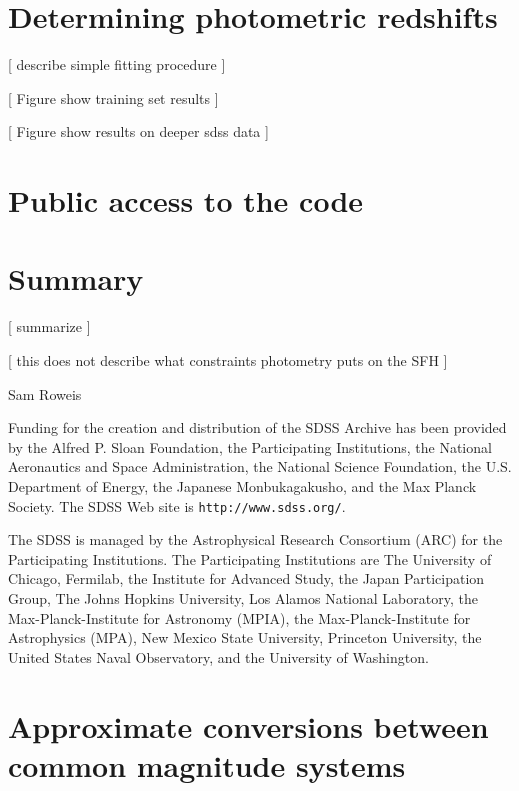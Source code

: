 \documentclass[10pt,preprint]{aastex}
\begin{document}
\section{Determining photometric redshifts}
\label{kphotoz}

[ describe simple fitting procedure ]

[ Figure show training set results ]

[ Figure show results on deeper sdss data ] 

\section{Public access to the code}

\section{Summary}
\label{conclusions}

[ summarize ]

[ this does not describe what constraints photometry puts on the SFH ]

\acknowledgments

Sam Roweis

Funding for the creation and distribution of the SDSS Archive has been
provided by the Alfred P. Sloan Foundation, the Participating
Institutions, the National Aeronautics and Space Administration, the
National Science Foundation, the U.S. Department of Energy, the
Japanese Monbukagakusho, and the Max Planck Society. The SDSS Web site
is {\tt http://www.sdss.org/}.

The SDSS is managed by the Astrophysical Research Consortium (ARC) for
the Participating Institutions. The Participating Institutions are The
University of Chicago, Fermilab, the Institute for Advanced Study, the
Japan Participation Group, The Johns Hopkins University, Los Alamos
National Laboratory, the Max-Planck-Institute for Astronomy (MPIA),
the Max-Planck-Institute for Astrophysics (MPA), New Mexico State
University, Princeton University, the United States Naval Observatory,
and the University of Washington.
 



\appendix

\section{Approximate conversions between common magnitude systems}

\newpage

%


\end{document}
